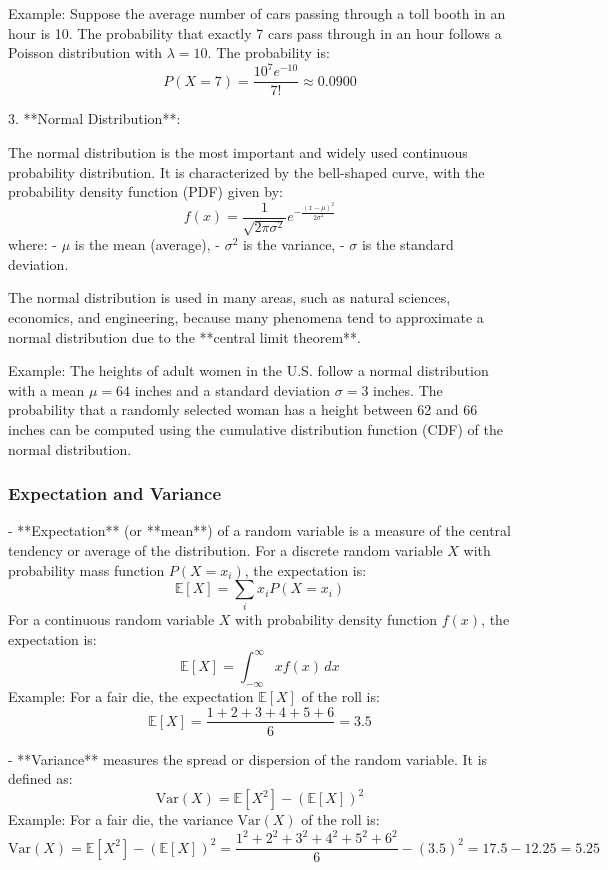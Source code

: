 \documentclass{article}
\begin{document}
   Example: Suppose the average number of cars passing through a toll booth in an hour is 10. The probability that exactly 7 cars pass through in an hour follows a Poisson distribution with \( \lambda = 10 \). The probability is:
   \[
   P(X = 7) = \frac{10^7 e^{-10}}{7!} \approx 0.0900
   \]

3. **Normal Distribution**:

   The normal distribution is the most important and widely used continuous probability distribution. It is characterized by the bell-shaped curve, with the probability density function (PDF) given by:
   \[
   f(x) = \frac{1}{\sqrt{2\pi \sigma^2}} e^{-\frac{(x - \mu)^2}{2\sigma^2}}
   \]
   where:
   - \( \mu \) is the mean (average),
   - \( \sigma^2 \) is the variance,
   - \( \sigma \) is the standard deviation.

   The normal distribution is used in many areas, such as natural sciences, economics, and engineering, because many phenomena tend to approximate a normal distribution due to the **central limit theorem**.

   Example: The heights of adult women in the U.S. follow a normal distribution with a mean \( \mu = 64 \) inches and a standard deviation \( \sigma = 3 \) inches. The probability that a randomly selected woman has a height between 62 and 66 inches can be computed using the cumulative distribution function (CDF) of the normal distribution.

\subsubsection*{Expectation and Variance}

- **Expectation** (or **mean**) of a random variable is a measure of the central tendency or average of the distribution. For a discrete random variable \( X \) with probability mass function \( P(X = x_i) \), the expectation is:
  \[
  \mathbb{E}[X] = \sum_{i} x_i P(X = x_i)
  \]
  For a continuous random variable \( X \) with probability density function \( f(x) \), the expectation is:
  \[
  \mathbb{E}[X] = \int_{-\infty}^{\infty} x f(x) \, dx
  \]
  Example: For a fair die, the expectation \( \mathbb{E}[X] \) of the roll is:
  \[
  \mathbb{E}[X] = \frac{1 + 2 + 3 + 4 + 5 + 6}{6} = 3.5
  \]

- **Variance** measures the spread or dispersion of the random variable. It is defined as:
  \[
  \text{Var}(X) = \mathbb{E}[X^2] - (\mathbb{E}[X])^2
  \]
  Example: For a fair die, the variance \( \text{Var}(X) \) of the roll is:
  \[
  \text{Var}(X) = \mathbb{E}[X^2] - (\mathbb{E}[X])^2 = \frac{1^2 + 2^2 + 3^2 + 4^2 + 5^2 + 6^2}{6} - (3.5)^2 = 17.5 - 12.25 = 5.25
  \]
\end{document}
